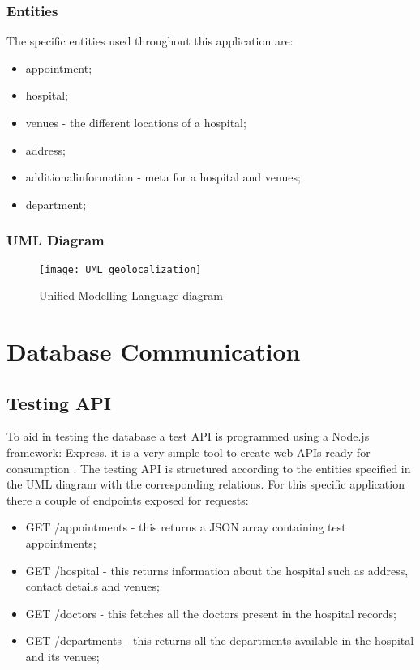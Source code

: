 \subsubsection{Entities}
The specific entities used throughout this application are:
\begin{itemize}
\item appointment;
\item hospital;
\item venues - the different locations of a hospital;
\item address;
\item additionalinformation - meta for a hospital and venues;
\item department;
\end{itemize}
\subsubsection{UML Diagram}
\begin{landscape}
\begin{figure}[!h]
\centering
\texttt{[image: UML\_geolocalization]}
\caption{Unified Modelling Language diagram}
\end{figure}
\end{landscape}
\section{Database Communication}
\subsection{Testing API}
To aid in testing the database a test API is programmed using a Node.js framework: Express. it is a very simple tool to create web APIs ready for consumption \cite{Express2019}. The testing API is structured according to the entities specified in the UML diagram with the corresponding relations. For this specific application there a couple of endpoints exposed for requests:
\begin{itemize}
\item GET /appointments - this returns a JSON array containing test appointments;
\item GET /hospital - this returns information about the hospital such as address, contact details and venues;
\item GET /doctors - this fetches all the doctors present in the hospital records;
\item GET /departments - this returns all the departments available in the hospital and its venues;
\end{itemize}
